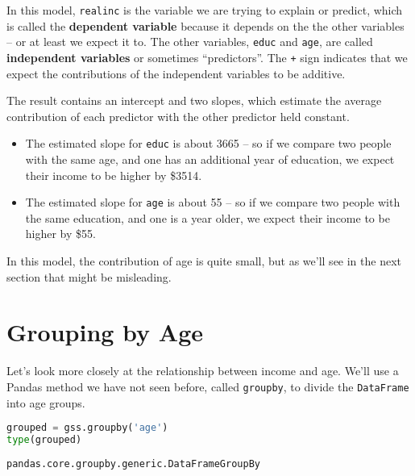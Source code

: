In this model, \passthrough{\lstinline!realinc!} is the variable we are
trying to explain or predict, which is called the \textbf{dependent
variable} because it depends on the the other variables -- or at least
we expect it to. The other variables, \passthrough{\lstinline!educ!} and
\passthrough{\lstinline!age!}, are called \textbf{independent variables}
or sometimes ``predictors''. The \passthrough{\lstinline!+!} sign
indicates that we expect the contributions of the independent variables
to be additive.

The result contains an intercept and two slopes, which estimate the
average contribution of each predictor with the other predictor held
constant.

\begin{itemize}
\item
  The estimated slope for \passthrough{\lstinline!educ!} is about 3665
  -- so if we compare two people with the same age, and one has an
  additional year of education, we expect their income to be higher by
  \$3514.
\item
  The estimated slope for \passthrough{\lstinline!age!} is about 55 --
  so if we compare two people with the same education, and one is a year
  older, we expect their income to be higher by \$55.
\end{itemize}

In this model, the contribution of age is quite small, but as we'll see
in the next section that might be misleading.

\section{Grouping by Age}\label{grouping-by-age}

Let's look more closely at the relationship between income and age.
We'll use a Pandas method we have not seen before, called
\passthrough{\lstinline!groupby!}, to divide the
\passthrough{\lstinline!DataFrame!} into age groups.

\begin{lstlisting}[language=Python,style=source]
grouped = gss.groupby('age')
type(grouped)
\end{lstlisting}

\begin{lstlisting}[style=output]
pandas.core.groupby.generic.DataFrameGroupBy
\end{lstlisting}


